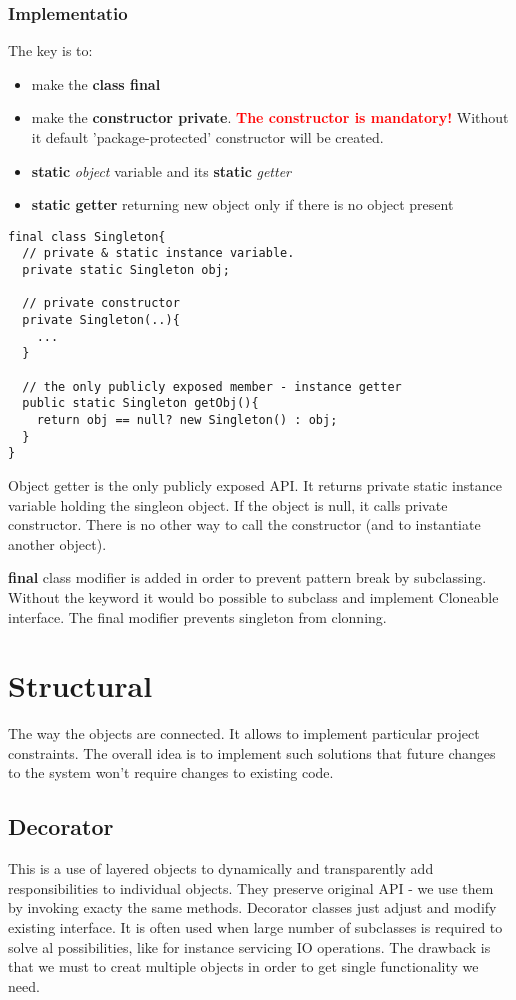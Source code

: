 \documentclass{report}
\begin{document}
\subsection{Implementatio}
The key is to:
\begin{itemize}
	\item make the \textbf{class final}
	\item make the \textbf{constructor private}. \textbf{\textcolor{red}{The constructor is mandatory!}} Without it default 'package-protected'
	constructor will be created.
	\item \textbf{static} \textit{object} variable and its \textbf{static} \textit{getter}
	\item \textbf{static getter} returning new object only if there is no object present
\end{itemize}

\begin{verbatim}
final class Singleton{
  // private & static instance variable.
  private static Singleton obj;

  // private constructor
  private Singleton(..){
    ...
  }

  // the only publicly exposed member - instance getter
  public static Singleton getObj(){
    return obj == null? new Singleton() : obj;
  }
}
\end{verbatim}

Object getter is the only publicly exposed API. It returns private static instance variable holding the singleon object. If the object is null, it calls private constructor. There is no other way to call the constructor (and to instantiate another object).

\textbf{final} class modifier is added in order to prevent pattern break by subclassing. Without the keyword it would bo possible to subclass and implement Cloneable interface.
The final modifier prevents singleton from clonning.



\chapter{Structural}
The way the objects are connected. It allows to implement particular project constraints. The overall idea is to implement such solutions
that future changes to the system won't require changes to existing code.


\section{Decorator}
This is a use of layered objects to dynamically and transparently add responsibilities to individual objects. They preserve
original API - we use them by invoking exacty the same methods. Decorator classes just adjust and modify existing interface.
It is often used when large number of subclasses is required to solve al possibilities, like for instance servicing IO
operations. The drawback is that we must to creat multiple objects in order to get single functionality we need.
\end{document}
